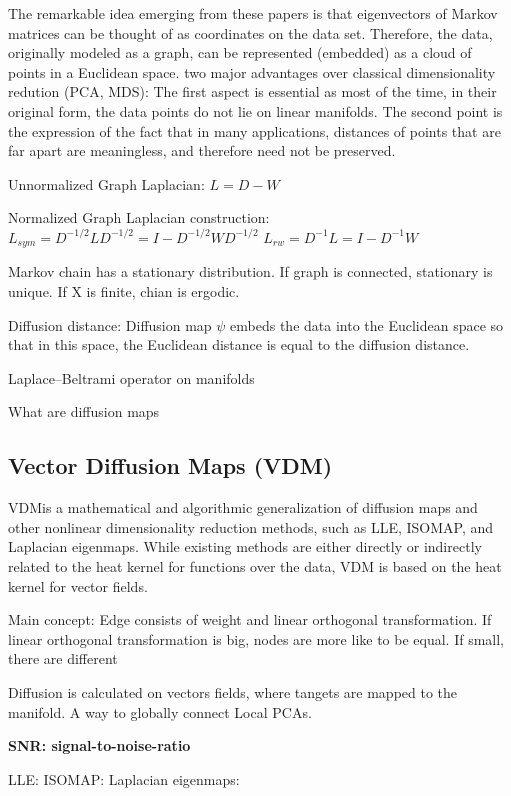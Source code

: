 The remarkable idea emerging from these papers is that eigenvectors of Markov matrices can be thought of as coordinates
on the data set. Therefore, the data, originally modeled as a graph, can be represented (embedded) as a cloud of points
in a Euclidean space.
two major advantages over classical dimensionality redution (PCA, MDS):
The first aspect is essential as most of the time, in their original form, the data points do not lie on
 linear manifolds.
 The second point is the expression of the fact that in many
applications, distances of points that are far apart are meaningless, and therefore need not be preserved.

Unnormalized Graph Laplacian:
$L = D - W$

Normalized Graph Laplacian construction:
$L_{sym} = D^{-1/2}LD^{-1/2} = I - D^{-1/2}WD^{-1/2} $
$L_{rw} = D^{-1}L = I - D^{-1}W $

Markov chain has a stationary distribution.
If graph is connected, stationary is unique.
If X is finite, chian is ergodic.

Diffusion distance:
Diffusion map $\psi$ embeds the data into the Euclidean space so that in this space, the Euclidean
distance is equal to the diffusion distance.

Laplace–Beltrami operator on manifolds

What are diffusion maps

\subsection{Vector Diffusion Maps (VDM)}

\cite{vectorDiffusionMaps}
VDMis a mathematical and algorithmic generalization of diffusion maps
and other nonlinear dimensionality reduction methods, such as LLE, ISOMAP,
and Laplacian eigenmaps. While existing methods are either directly or indirectly
related to the heat kernel for functions over the data, VDM is based on
the heat kernel for vector fields.

Main concept:
Edge consists of weight and linear orthogonal transformation.
If linear orthogonal transformation is big, nodes are more like to be equal.
If small, there are different

Diffusion is calculated on vectors fields, where tangets are mapped to the manifold.
A way to globally connect Local PCAs.

\textbf{SNR: signal-to-noise-ratio}


LLE:
ISOMAP:
Laplacian eigenmaps:


